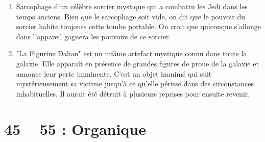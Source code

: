 \documentclass{article}
\begin{document}
\begin{enumerate}
	\item Sarcophage d'un célèbre sorcier mystique qui a combattu les Jedi dans les temps anciens. Bien que le sarcophage soit vide, on dit que le pouvoir du sorcier habite toujours cette tombe portable. On croit que quiconque s'allonge dans l'appareil gagnera les pouvoirs de ce sorcier.
	\item "La Figurine Dalian" est un infâme artefact mystique connu dans toute la galaxie. Elle apparaît en présence de grandes figures de proue de la galaxie et annonce leur perte imminente. C'est un objet inanimé qui suit mystérieusement sa victime jusqu'à ce qu'elle périsse dans des circonstances inhabituelles. Il aurait été détruit à plusieurs reprises pour ensuite revenir.
\end{enumerate}
\section*{45 -- 55 : Organique}
\end{document}

